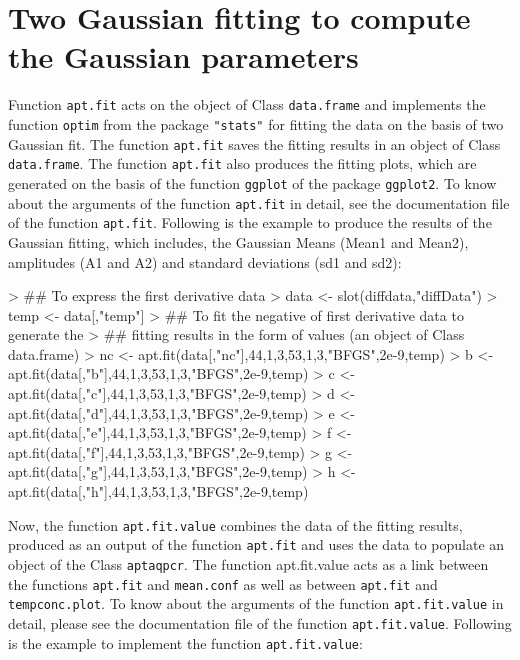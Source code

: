 \documentclass[11pt]{article}
\newcommand{\code}[1]{{\tt #1}}
\newcommand{\pkg}[1]{{\tt "#1"}}
\begin{document}
\section{Two Gaussian fitting to compute the Gaussian parameters}
Function \code{apt.fit} acts on the object of Class \code{data.frame} and implements the function \code{optim} from the package \pkg{stats} for fitting the data on the basis of two Gaussian fit. The function \code{apt.fit} saves the fitting results in an object of Class \code{data.frame}. The function \code{apt.fit} also produces the fitting plots, which are generated on the basis of the function \code{ggplot} of the package \code{ggplot2}. To know about the arguments of the function \code{apt.fit} in detail, see the documentation file of the function \code{apt.fit}. Following is the example to produce the results of the Gaussian fitting, which includes, the Gaussian Means (Mean1 and Mean2), amplitudes (A1 and A2) and standard deviations (sd1 and sd2):

\begin{Schunk}
\begin{Sinput}
> ## To express the first derivative data
> data <- slot(diffdata,"diffData")
> temp <- data[,"temp"]
> ## To fit the negative of first derivative data to generate the
> ## fitting results in the form of values (an object of Class data.frame)
> nc <- apt.fit(data[,"nc"],44,1,3,53,1,3,"BFGS",2e-9,temp)
> b <- apt.fit(data[,"b"],44,1,3,53,1,3,"BFGS",2e-9,temp)
> c <- apt.fit(data[,"c"],44,1,3,53,1,3,"BFGS",2e-9,temp)
> d <- apt.fit(data[,"d"],44,1,3,53,1,3,"BFGS",2e-9,temp)
> e <- apt.fit(data[,"e"],44,1,3,53,1,3,"BFGS",2e-9,temp)
> f <- apt.fit(data[,"f"],44,1,3,53,1,3,"BFGS",2e-9,temp)
> g <- apt.fit(data[,"g"],44,1,3,53,1,3,"BFGS",2e-9,temp)
> h <- apt.fit(data[,"h"],44,1,3,53,1,3,"BFGS",2e-9,temp)
\end{Sinput}
\end{Schunk}

Now, the function \code{apt.fit.value} combines the data of the fitting results, produced as an output of the function \code{apt.fit} and uses the data to populate an object of the Class \code{aptaqpcr}. The function apt.fit.value acts as a link between the functions \code{apt.fit} and \code{mean.conf} as well as between \code{apt.fit} and \code{tempconc.plot}. To know about the arguments of the function \code{apt.fit.value} in detail, please see the documentation file of the function \code{apt.fit.value}. Following is the example to implement the function \code{apt.fit.value}:
\end{document}
